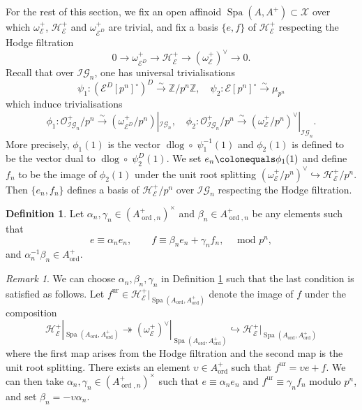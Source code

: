 \documentclass[10pt, oneside]{amsart}
\newcommand{\defeq}{\colonequals}
\numberwithin{equation}{subsection}
\theoremstyle{definition}
\newtheorem{definition}[equation]{Definition}
\theoremstyle{remark}
\newtheorem{remark}[equation]{Remark}
\newcommand{\mbb}[1]{\mathbb{#1}}
\newcommand{\opn}[1]{\operatorname{#1}}
\begin{document}
For the rest of this section, we fix an open affinoid $\opn{Spa}(A, A^+) \subset \mathcal{X}$ over which $\omega_{\mathcal{E}}^+$, $\mathcal{H}_{\mathcal{E}}^+$ and $\omega_{\mathcal{E}^D}^+$ are trivial, and fix a basis $\{ e, f \}$ of $\mathcal{H}_{\mathcal{E}}^+$ respecting the Hodge filtration
\[
0 \to \omega_{\mathcal{E}^D}^+ \to \mathcal{H}_{\mathcal{E}}^+ \to (\omega_{\mathcal{E}}^+)^{\vee} \to 0 .
\]
Recall that over $\mathcal{IG}_n$, one has universal trivialisations 
\[
\psi_1 \colon \left(\mathcal{E}^D[p^{n}]^{\circ}\right)^D \xrightarrow{\sim} \mbb{Z}/p^n\mbb{Z}, \quad \psi_2 \colon \mathcal{E}[p^{n}]^{\circ} \xrightarrow{\sim} \mu_{p^{n}}
\]
which induce trivialisations
\[
\phi_1 \colon \mathcal{O}^+_{\mathcal{IG}_n}/p^n \xrightarrow{\sim} (\omega_{\mathcal{E}^D}^+/p^n)|_{\mathcal{IG}_{n}}, \quad  \phi_2 \colon \mathcal{O}^+_{\mathcal{IG}_n}/p^n \xrightarrow{\sim} (\omega_{\mathcal{E}}^+/p^n)^{\vee}|_{\mathcal{IG}_n}.
\]
More precisely, $\phi_1(1)$ is the vector $\opn{dlog} \circ \; \psi_1^{-1}(1)$ and $\phi_2(1)$ is defined to be the vector dual to $\opn{dlog} \circ \; \psi_2^D(1)$. We set $e_n \defeq \phi_1(1)$ and define $f_n$ to be the image of $\phi_2(1)$ under the unit root splitting $(\omega_{\mathcal{E}}^+/p^n)^{\vee} \hookrightarrow \mathcal{H}_{\mathcal{E}}^+/p^n$. Then $\{e_n, f_n \}$ defines a basis of $\mathcal{H}_{\mathcal{E}}^+/p^n$ over $\mathcal{IG}_n$ respecting the Hodge filtration. 

\begin{definition} \label{DefOfAlphanBetanGamman}
Let $\alpha_n, \gamma_n \in (A_{\opn{ord}, n}^+)^{\times}$ and $\beta_n \in A_{\opn{ord}, n}^+$ be any elements such that
\[
e \equiv \alpha_n e_n, \quad \quad f \equiv \beta_n e_n + \gamma_n f_n, \quad \text{ mod } p^n ,
\]
and $\alpha_n^{-1} \beta_n \in A_{\opn{ord}}^+$.
\end{definition}

\begin{remark}
    We can choose $\alpha_n, \beta_n, \gamma_n$ in Definition \ref{DefOfAlphanBetanGamman} such that the last condition is satisfied as follows. Let $f^{\opn{ur}} \in \mathcal{H}_{\mathcal{E}}^+|_{\opn{Spa}(A_{\opn{ord}}, A_{\opn{ord}}^+)}$ denote the image of $f$ under the composition
\[
\mathcal{H}_{\mathcal{E}}^+|_{\opn{Spa}(A_{\opn{ord}}, A_{\opn{ord}}^+)} \twoheadrightarrow \left(\omega_{\mathcal{E}}^+\right)^{\vee}|_{\opn{Spa}(A_{\opn{ord}}, A_{\opn{ord}}^+)} \hookrightarrow \mathcal{H}_{\mathcal{E}}^+|_{\opn{Spa}(A_{\opn{ord}}, A_{\opn{ord}}^+)}
\]
where the first map arises from the Hodge filtration and the second map is the unit root splitting. There exists an element $\upsilon \in A_{\opn{ord}}^+$ such that $f^{\opn{ur}} = \upsilon e + f$. We can then take $\alpha_n, \gamma_n \in (A_{\opn{ord}, n}^+)^{\times}$ such that $e \equiv \alpha_n e_n$ and $f^{\opn{ur}} \equiv \gamma_n f_n$ modulo $p^n$, and set $\beta_n = -\upsilon \alpha_n$.
\end{remark}
\end{document}
